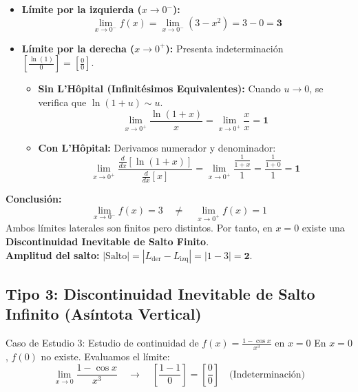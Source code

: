 \documentclass[10pt,a4paper]{article}
\begin{document}
\begin{itemize}\itemsep 3pt
    \item \textbf{Límite por la izquierda ($x \to 0^-$):}
    $$\lim_{x \to 0^-} f(x) = \lim_{x \to 0^-} (3 - x^2) = 3 - 0 = \mathbf{3}$$

    \item \textbf{Límite por la derecha ($x \to 0^+$):} Presenta indeterminación $\left[\frac{\ln(1)}{0}\right] = \left[\frac{0}{0}\right]$.
    \begin{itemize}\itemsep 2pt
        \item \textbf{Sin L'Hôpital (Infinitésimos Equivalentes):} Cuando $u \to 0$, se verifica que $\ln(1+u) \sim u$.
        $$\lim_{x \to 0^+} \frac{\ln(1+x)}{x} = \lim_{x \to 0^+} \frac{x}{x} = \mathbf{1}$$
        \item \textbf{Con L'Hôpital:} Derivamos numerador y denominador:
        $$\lim_{x \to 0^+} \frac{\frac{d}{dx}[\ln(1+x)]}{\frac{d}{dx}[x]} = \lim_{x \to 0^+} \frac{\frac{1}{1+x}}{1} = \frac{\frac{1}{1+0}}{1} = \mathbf{1}$$
    \end{itemize}
\end{itemize}

\textbf{Conclusión:}
$$\lim_{x \to 0^-} f(x) = 3 \quad \neq \quad \lim_{x \to 0^+} f(x) = 1$$
Ambos límites laterales son finitos pero distintos. Por tanto, en $x = 0$ existe una \textbf{Discontinuidad Inevitable de Salto Finito}.\\
\textbf{Amplitud del salto:} $|\text{Salto}| = |L_{\text{der}} - L_{\text{izq}}| = |1 - 3| = \mathbf{2}$.

\newpage

\subsection{Tipo 3: Discontinuidad Inevitable de Salto Infinito (Asíntota Vertical)}

\begin{ejemplobox}{Caso de Estudio 3: Estudio de continuidad de $f(x) = \frac{1 - \cos x}{x^3}$ en $x = 0$}
En $x = 0$, $f(0)$ no existe. Evaluamos el límite:
$$\lim_{x \to 0} \frac{1 - \cos x}{x^3} \quad \longrightarrow \quad \left[\frac{1 - 1}{0}\right] = \left[\frac{0}{0}\right] \quad \text{(Indeterminación)}$$
\end{ejemplobox}
\end{document}
